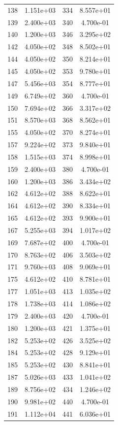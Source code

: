 \documentclass[12pt]{article}
\begin{document}
\begin{longtable}{@{}cccc@{}}
138 & 1.151e+03 & 334 & 8.557e+01 \\
139 & 2.400e+03 & 340 & 4.700e-01 \\
140 & 1.200e+03 & 346 & 3.295e+02 \\
142 & 4.050e+02 & 348 & 8.502e+01 \\
144 & 4.050e+02 & 350 & 8.214e+01 \\
145 & 4.050e+02 & 353 & 9.780e+01 \\
147 & 5.456e+03 & 354 & 8.777e+01 \\
149 & 6.749e+02 & 360 & 4.700e-01 \\
150 & 7.694e+02 & 366 & 3.317e+02 \\
151 & 8.570e+03 & 368 & 8.562e+01 \\
155 & 4.050e+02 & 370 & 8.274e+01 \\
157 & 9.224e+02 & 373 & 9.840e+01 \\
158 & 1.515e+03 & 374 & 8.998e+01 \\
159 & 2.400e+03 & 380 & 4.700e-01 \\
160 & 1.200e+03 & 386 & 3.434e+02 \\
162 & 4.612e+02 & 388 & 8.622e+01 \\
164 & 4.612e+02 & 390 & 8.334e+01 \\
165 & 4.612e+02 & 393 & 9.900e+01 \\
167 & 5.255e+03 & 394 & 1.017e+02 \\
169 & 7.687e+02 & 400 & 4.700e-01 \\
170 & 8.763e+02 & 406 & 3.503e+02 \\
171 & 9.760e+03 & 408 & 9.069e+01 \\
175 & 4.612e+02 & 410 & 8.781e+01 \\
177 & 1.051e+03 & 413 & 1.035e+02 \\
178 & 1.738e+03 & 414 & 1.086e+02 \\
179 & 2.400e+03 & 420 & 4.700e-01 \\
180 & 1.200e+03 & 421 & 1.375e+01 \\
182 & 5.253e+02 & 426 & 3.525e+02 \\
184 & 5.253e+02 & 428 & 9.129e+01 \\
185 & 5.253e+02 & 430 & 8.841e+01 \\
187 & 5.026e+03 & 433 & 1.041e+02 \\
189 & 8.756e+02 & 434 & 1.246e+02 \\
190 & 9.981e+02 & 440 & 4.700e-01 \\
191 & 1.112e+04 & 441 & 6.036e+01 \\

\end{longtable}
\end{document}

